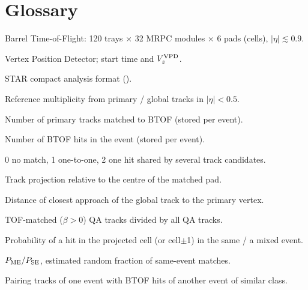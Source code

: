 \section{Glossary}
\label{sec:glossary}
\begin{description}\itemsep0pt
\item[BTOF] Barrel Time-of-Flight: 120 trays $\times$ 32 MRPC modules $\times$ 6 pads (cells), $|\eta|\lesssim0.9$.
\item[VPD] Vertex Position Detector; start time and $V_z^{\rm VPD}$.
\item[picoDst] STAR compact analysis format ().
\item[refMult / gRefMult] Reference multiplicity from primary / global tracks in $|\eta|<0.5$.
\item[nBTOFMatch] Number of primary tracks matched to BTOF (stored per event).
\item[btofTrayMultiplicity] Number of BTOF hits in the event (stored per event).
\item[btofMatchFlag] 0 no match, 1 one-to-one, 2 one hit shared by several track candidates.
\item[$y_{\rm local}$, $z_{\rm local}$] Track projection relative to the centre of the matched pad.
\item[gDCA] Distance of closest approach of the global track to the primary vertex.
\item[$\varepsilon_{\rm match}$] TOF-matched ($\beta>0$) QA tracks divided by all QA tracks.
\item[$P_{\rm SE}$, $P_{\rm ME}$] Probability of a hit in the projected cell (or cell$\pm$1) in the same / a mixed event.
\item[$f_{\rm rand}$] $P_{\rm ME}/P_{\rm SE}$, estimated random fraction of same-event matches.
\item[Mixed event] Pairing tracks of one event with BTOF hits of another event of similar class.
\end{description}
